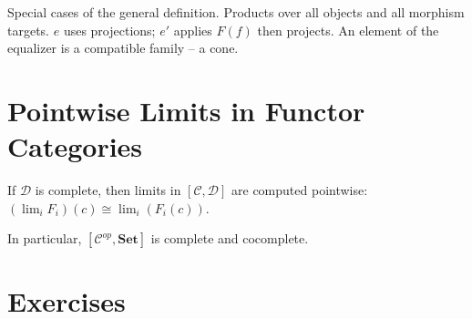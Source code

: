 \begin{prooflog}
           {Special cases of the general definition.}
           {Products over all objects and all morphism targets.}
           {$e$ uses projections; $e'$ applies $F(f)$ then projects.}
           {An element of the equalizer is a compatible family -- a cone.}
\end{prooflog}

\section{Pointwise Limits in Functor Categories}

\begin{theorem}
If $\mathcal{D}$ is complete, then limits in $[\mathcal{C}, \mathcal{D}]$ are
computed pointwise: $(\lim_i F_i)(c) \cong \lim_i (F_i(c))$.
\end{theorem}

In particular, $[\mathcal{C}^{op}, \mathbf{Set}]$ is complete and cocomplete.

\section{Exercises}

